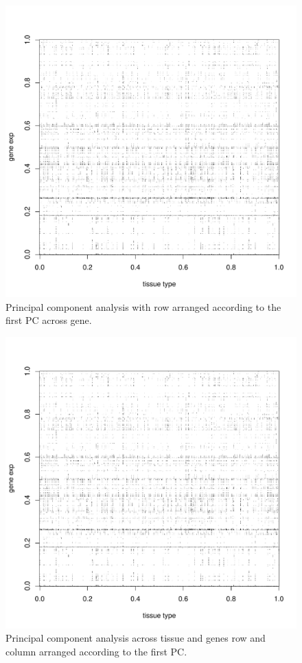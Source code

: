 \documentclass{article}
\begin{document}
\begin{figure}[ht]
	\begin{center}
		\includegraphics[scale=0.5]{interactionMatrixGenePC.pdf}
	\end{center}
	\caption{Principal component analysis with row arranged according to the first PC across gene.}
	\label{fig:intMPCG}
\end{figure}


\begin{figure}[ht]
	\begin{center}
		\includegraphics[scale=0.5]{interactionMatrixTissueGenePC.pdf}
	\end{center}
	\caption{Principal component analysis across tissue and genes row  and column arranged according to the first PC.}
	\label{fig:intMPCA}
\end{figure}
\end{document}
